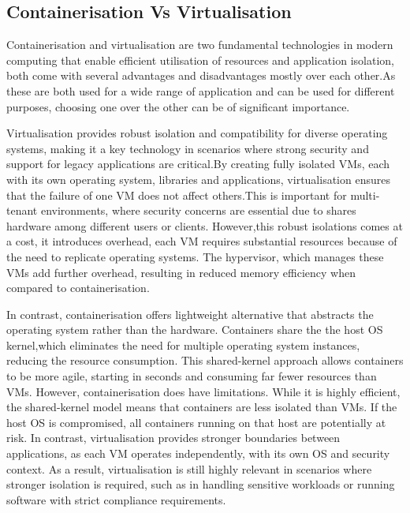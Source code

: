 \subsection{Containerisation Vs Virtualisation}
Containerisation and virtualisation are two fundamental technologies in modern computing that enable efficient utilisation of resources and application isolation, both come with several advantages and disadvantages mostly over each other.As these are both used for a wide range of application and can be used for different purposes, choosing one over the other can be of significant importance.\cite{ConVSVirt}

Virtualisation provides robust isolation and compatibility for diverse operating systems, making it a key technology in scenarios where strong security and support for legacy applications are critical.By creating fully isolated VMs, each with its own operating system, libraries and applications, virtualisation ensures that the failure of one VM does not affect others.This is important for multi-tenant environments, where security concerns are essential due to shares hardware among different users or clients.\cite{Virt2013}
However,this robust isolations comes at a cost, it introduces overhead, each VM requires substantial resources because of the need to replicate operating systems. The hypervisor, which manages these VMs add further overhead, resulting in reduced memory efficiency when compared to containerisation. 

In contrast, containerisation offers lightweight alternative that abstracts the operating system rather than the hardware. Containers share the the host OS kernel,which eliminates the need for multiple operating system instances, reducing the resource consumption.\cite{2022containerization}
This shared-kernel approach allows containers to be more agile, starting in seconds and consuming far fewer resources than VMs.\cite{Con2014docker}
However, containerisation does have limitations. While it is highly efficient, the shared-kernel model means that containers are less isolated than VMs. If the host OS is compromised, all containers running on that host are potentially at risk. In contrast, virtualisation provides stronger boundaries between applications, as each VM operates independently, with its own OS and security context. As a result, virtualisation is still highly relevant in scenarios where stronger isolation is required, such as in handling sensitive workloads or running software with strict compliance requirements.


